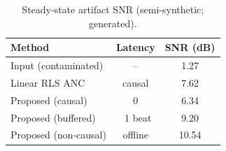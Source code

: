 \begin{table}[!ht]
\centering
\caption{Steady-state artifact SNR (semi-synthetic; generated).}
\label{tab:results}
\begin{tabular}{@{}lcc@{}}
\toprule
Method & Latency & SNR (dB) \\
\midrule
Input (contaminated) & -- & 1.27 \\
Linear RLS ANC & causal & 7.62 \\
Proposed (causal) & 0 & 6.34 \\
Proposed (buffered) & ~1 beat & 9.20 \\
Proposed (non-causal) & offline & 10.54 \\
\bottomrule
\end{tabular}
\end{table}
